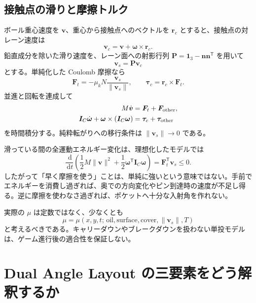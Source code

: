 \documentclass[11pt,a4paper]{article}
\newcommand{\vect}[1]{\bm{#1}}
\newcommand{\mat}[1]{\bm{#1}}
\newcommand{\dd}{\,\mathrm{d}}
\begin{document}
\subsection{接触点の滑りと摩擦トルク}

ボール重心速度を $\vect v$、重心から接触点へのベクトルを $\vect r_c$ とすると、接触点の対レーン速度は
\begin{equation}
 \vect v_c=\vect v+\vect\omega\times\vect r_c.
\end{equation}
鉛直成分を除いた滑り速度を、レーン面への射影行列
$\mat P=\mat 1_3-\vect n\vect n^{\mathsf T}$ を用いて
\begin{equation}
 \vect v_s=\mat P\vect v_c
\end{equation}
とする。単純化した Coulomb 摩擦なら
\begin{equation}
 \vect F_t=-\mu_k N\frac{\vect v_s}{\|\vect v_s\|},
 \qquad
 \vect\tau_c=\vect r_c\times\vect F_t.
 \label{eq:friction}
\end{equation}
並進と回転を連成して
\begin{align}
 M\dot{\vect v}&=\vect F_t+\vect F_{\rm other},\\
 \mat I_C\dot{\vect\omega}+\vect\omega\times(\mat I_C\vect\omega)&=\vect\tau_c+\vect\tau_{\rm other}
 \label{eq:coupled}
\end{align}
を時間積分する。純粋転がりへの移行条件は $\|\vect v_s\|\to0$ である。

滑っている間の全運動エネルギー変化は、理想化したモデルでは
\begin{equation}
 \frac{\dd}{\dd t}
 \left(
   \frac{1}{2}M\|\vect v\|^2
   +\frac{1}{2}\vect\omega^{\mathsf T}\mat I_C\vect\omega
 \right)
 =\vect F_t^{\mathsf T}\vect v_s\le0.
 \label{eq:energy}
\end{equation}
したがって「早く摩擦を使う」ことは、単純に強いという意味ではない。手前でエネルギーを消費し過ぎれば、奥での方向変化やピン到達時の速度が不足し得る。逆に摩擦を使わなさ過ぎれば、ポケットへ十分な入射角を作れない。

実際の $\mu$ は定数ではなく、少なくとも
\begin{equation}
 \mu=\mu(x,y,t;\,\text{oil},\text{surface},\text{cover},\|\vect v_s\|,T)
\end{equation}
と考えるべきである。キャリーダウンやブレークダウンを扱わない単投モデルは、ゲーム進行後の適合性を保証しない。

\section{Dual Angle Layout の三要素をどう解釈するか}
\end{document}
